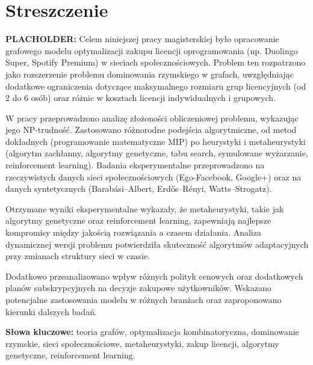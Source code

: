 \section*{Streszczenie}

\textbf{PLACHOLDER:} Celem niniejszej pracy magisterskiej było opracowanie grafowego modelu optymalizacji zakupu licencji oprogramowania (np. Duolingo Super, Spotify Premium) w sieciach społecznościowych. Problem ten rozpatrzono jako rozszerzenie problemu dominowania rzymskiego w grafach, uwzględniając dodatkowe ograniczenia dotyczące maksymalnego rozmiaru grup licencyjnych (od 2 do 6 osób) oraz różnic w kosztach licencji indywidualnych i grupowych.

W pracy przeprowadzono analizę złożoności obliczeniowej problemu, wykazując jego NP-trudność. Zastosowano różnorodne podejścia algorytmiczne, od metod dokładnych (programowanie matematyczne MIP) po heurystyki i metaheurystyki (algorytm zachłanny, algorytmy genetyczne, tabu search, symulowane wyżarzanie, reinforcement learning). Badania eksperymentalne przeprowadzono na rzeczywistych danych sieci społecznościowych (Ego-Facebook, Google+) oraz na danych syntetycznych (Barabási–Albert, Erdős–Rényi, Watts–Strogatz).

Otrzymane wyniki eksperymentalne wykazały, że metaheurystyki, takie jak algorytmy genetyczne oraz reinforcement learning, zapewniają najlepsze kompromisy między jakością rozwiązania a czasem działania. Analiza dynamicznej wersji problemu potwierdziła skuteczność algorytmów adaptacyjnych przy zmianach struktury sieci w czasie.

Dodatkowo przeanalizowano wpływ różnych polityk cenowych oraz dodatkowych planów subskrypcyjnych na decyzje zakupowe użytkowników. Wskazano potencjalne zastosowania modelu w różnych branżach oraz zaproponowano kierunki dalszych badań.

\textbf{Słowa kluczowe:} teoria grafów, optymalizacja kombinatoryczna, dominowanie rzymskie, sieci społecznościowe, metaheurystyki, zakup licencji, algorytmy genetyczne, reinforcement learning.

